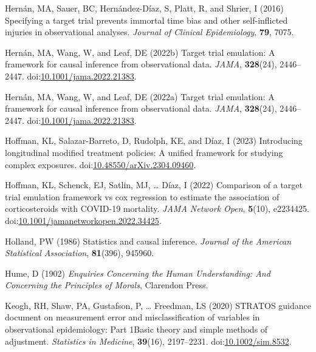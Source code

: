 \documentclass[
  singlecolumn]{article}
\newlength{\cslhangindent}
\newenvironment{CSLReferences}[2] %
 {\begin{list}{}{%
  \setlength{\itemindent}{0pt}
  \setlength{\leftmargin}{0pt}
  \setlength{\parsep}{0pt}
  \ifodd #1
   \setlength{\leftmargin}{\cslhangindent}
   \setlength{\itemindent}{-1\cslhangindent}
  \fi
  \setlength{\itemsep}{#2\baselineskip}}}
 {\end{list}}
\begin{document}
\begin{CSLReferences}{1}{0}
Hernán, MA, Sauer, BC, Hernández-Díaz, S, Platt, R, and Shrier, I (2016)
Specifying a target trial prevents immortal time bias and other
self-inflicted injuries in observational analyses. \emph{Journal of
Clinical Epidemiology}, \textbf{79}, 7075.

Hernán, MA, Wang, W, and Leaf, DE (2022b) Target trial emulation: A
framework for causal inference from observational data. \emph{JAMA},
\textbf{328}(24), 2446--2447.
doi:\href{https://doi.org/10.1001/jama.2022.21383}{10.1001/jama.2022.21383}.

Hernán, MA, Wang, W, and Leaf, DE (2022a) Target trial emulation: A
framework for causal inference from observational data. \emph{JAMA},
\textbf{328}(24), 2446--2447.
doi:\href{https://doi.org/10.1001/jama.2022.21383}{10.1001/jama.2022.21383}.

Hoffman, KL, Salazar-Barreto, D, Rudolph, KE, and Díaz, I (2023)
Introducing longitudinal modified treatment policies: A unified
framework for studying complex exposures.
doi:\href{https://doi.org/10.48550/arXiv.2304.09460}{10.48550/arXiv.2304.09460}.

Hoffman, KL, Schenck, EJ, Satlin, MJ, \ldots{} Díaz, I (2022) Comparison
of a target trial emulation framework vs cox regression to estimate the
association of corticosteroids with COVID-19 mortality. \emph{JAMA
Network Open}, \textbf{5}(10), e2234425.
doi:\href{https://doi.org/10.1001/jamanetworkopen.2022.34425}{10.1001/jamanetworkopen.2022.34425}.

Holland, PW (1986) Statistics and causal inference. \emph{Journal of the
American Statistical Association}, \textbf{81}(396), 945960.

Hume, D (1902) \emph{Enquiries Concerning the Human Understanding: And
Concerning the Principles of Morals}, Clarendon Press.

Keogh, RH, Shaw, PA, Gustafson, P, \ldots{} Freedman, LS (2020) STRATOS
guidance document on measurement error and misclassification of
variables in observational epidemiology: Part 1{\textemdash}Basic theory
and simple methods of adjustment. \emph{Statistics in Medicine},
\textbf{39}(16), 2197--2231.
doi:\href{https://doi.org/10.1002/sim.8532}{10.1002/sim.8532}.


\end{CSLReferences}
\end{document}
